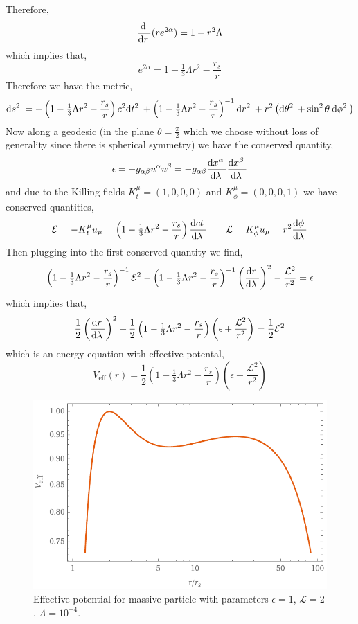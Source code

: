 \documentclass[12pt]{article}
\begin{document}
Therefore,
\[ \frac{\mathrm{d} \:}{\mathrm{d}r \:} (r e^{2 \alpha}) = 1 - r^2 \Lambda \]
which implies that,
\[ e^{2 \alpha} = 1 - \tfrac{1}{3} \Lambda r^2 - \frac{r_s}{r} \]
Therefore we have the metric,
\newcommand{\sh}[1]{\left( 1 - \tfrac{1}{3} \Lambda r^2 - \frac{r_s}{r}  \right)}
\[ \d{s^2} = - \sh{r} c^2 \d{t^2} + \sh{r}^{-1} \d{r^2} + r^2 \left( \d{\theta^2} + \sin^2{\theta} \: \d{\phi^2} \right) \]
Now along a geodesic (in the plane $\theta = \frac{\pi}{2}$ which we choose without loss of generality since there is spherical symmetry) we have the conserved quantity,
\[ \epsilon = - g_{\alpha \beta} u^\alpha u^\beta = -g_{\alpha \beta} \frac{\mathrm{d}x^\alpha \:}{\mathrm{d}\lambda \:} \frac{\mathrm{d}x^\beta \:}{\mathrm{d}\lambda \:} \] 
and due to the Killing fields $K_t^\mu = (1, 0, 0, 0)$ and $K_\phi^\mu = (0, 0, 0, 1)$ we have conserved quantities,
\[ \mathcal{E} = -K_t^\mu u_\mu = \sh{r}  \deriv{ct}{\lambda} \quad \quad \mathcal{L} = K_\phi^\mu u_\mu = r^2 \deriv{\phi}{\lambda} \]
Then plugging into the first conserved quantity we find,
\[ \sh{r}^{-1} \mathcal{E}^2 - \sh{r}^{-1} \left( \deriv{r}{\lambda} \right)^2 - \frac{\mathcal{L}^2}{r^2} = \epsilon \]
which implies that,
\[ \frac{1}{2} \left( \deriv{r}{\lambda} \right)^2 + \frac{1}{2} \sh{r} \left( \epsilon + \frac{\mathcal{L}^2}{r^2} \right) = \frac{1}{2} \mathcal{E}^2 \]
which is an energy equation with effective potental,
\[ V_{\text{eff}}(r) = \frac{1}{2} \sh{r} \left( \epsilon + \frac{\mathcal{L}^2}{r^2} \right) \]

\begin{figure}
\begin{center}
\includegraphics[scale=1]{Effective_Potential}
\end{center}
\caption{Effective potential for massive particle with parameters $\epsilon = 1$, $\mathcal{L} = 2$, $\Lambda = 10^{-4}$. }
\end{figure}
\end{document}
